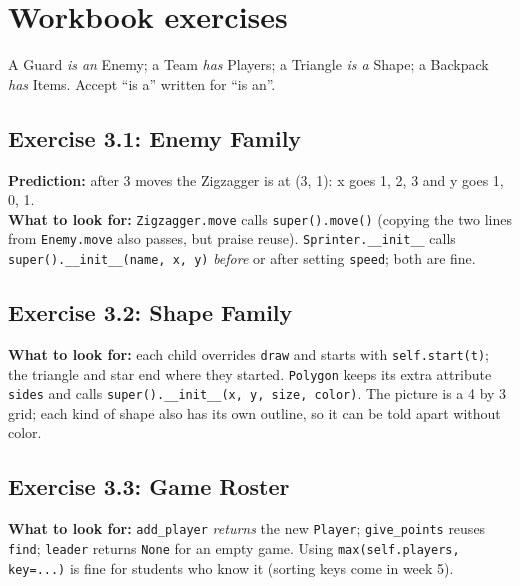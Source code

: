 
\section{Workbook exercises}
\begin{answer}
A Guard \emph{is an} Enemy; a Team \emph{has} Players; a Triangle \emph{is a} Shape; a Backpack \emph{has} Items. Accept \enquote{is a} written for \enquote{is an}.
\end{answer}

\subsection{Exercise 3.1: Enemy Family}
\begin{answer}
\textbf{Prediction:} after 3 moves the Zigzagger is at (3, 1): x goes 1, 2, 3 and y goes 1, 0, 1.\\
\textbf{What to look for:} \texttt{Zigzagger.move} calls \texttt{super().move()} (copying the two lines from \texttt{Enemy.move} also passes, but praise reuse).
\texttt{Sprinter.\_\_init\_\_} calls \texttt{super().\_\_init\_\_(name, x, y)} \emph{before} or after setting \texttt{speed}; both are fine.
\end{answer}

\subsection{Exercise 3.2: Shape Family}
\begin{answer}
\textbf{What to look for:} each child overrides \texttt{draw} and starts with \texttt{self.start(t)}; the triangle and star end where they started.
\texttt{Polygon} keeps its extra attribute \texttt{sides} and calls \texttt{super().\_\_init\_\_(x, y, size, color)}. The picture is a 4 by 3 grid; each kind of shape also has its own outline, so it can be told apart without color.
\end{answer}

\subsection{Exercise 3.3: Game Roster}
\begin{answer}
\textbf{What to look for:} \texttt{add\_player} \emph{returns} the new \texttt{Player}; \texttt{give\_points} reuses \texttt{find}; \texttt{leader} returns \texttt{None} for an empty game.
Using \texttt{max(self.players, key=...)} is fine for students who know it (sorting keys come in week 5).
\end{answer}


